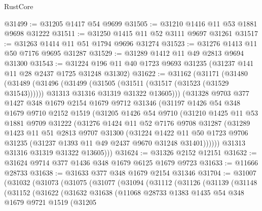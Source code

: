 \begin{lexlean}{RustCore}
\begin{coremodule}
@31499 := @31205 @1417 @54 @9699
@31505 := @31210 @1416 @11 @53 @1881 @9698 @31222
@31511 := @31250 @1415 @11 @52 @3111 @9697 @31261
@31517 := @31263 @1414 @11 @51 @1794 @9696 @31274
@31523 := @31276 @1413 @11 @50 @7176 @9695 @31287
@31529 := @31289 @1412 @11 @49 @2813 @9694 @31300
@31543 := @31224 @196 @11 @40 @1723 @9693 @31235 (@31237 @141 @11 @28 @2437 @1725 @31248 @31302)
@31622 := @31162
    (@31171
      (@31480
        (@31489
          (@31496
            (@31499 (@31505 (@31511 (@31517 (@31523 (@31529 @31543))))))
            @31313
            @31316
            @31319
            @31322
            @13605)))
      (@31328
        @9703
        @377
        @1427
        @348
        @1679
        @2154
        @1679
        @9712
        @31346
        (@31197
          @1426
          @54
          @348
          @1679
          @9710
          @2152
          @1519
          (@31205
            @1426
            @54
            @9710
            (@31210
              @1425
              @11
              @53
              @1881
              @9709
              @31222
              (@31276
                @1424
                @11
                @52
                @7176
                @9708
                @31287
                (@31289
                  @1423
                  @11
                  @51
                  @2813
                  @9707
                  @31300
                  (@31224
                    @1422
                    @11
                    @50
                    @1723
                    @9706
                    @31235
                    (@31237 @1393 @11 @49 @2437 @9670 @31248 @31401))))))
          @31313
          @31316
          @31319
          @31322
          @13605)))
@31624 := @31326 @2152 @12151
@31632 := @31624 @9714 @377 @1436 @348 @1679 @6125 @1679 @9723
@31633 := @11666 @28733
@31638 := @31633 @377 @348 @1679 @2154 @31346
@31704 := @31007
    (@31032
      (@31073
        (@31075
          (@31077
            (@31094
              (@31112
                (@31126
                  (@31139
                    (@31148
                      (@31152
                        (@31622
                          (@31632
                            @31638
                            (@11068
                              @28733
                              @1383
                              @1435
                              @54
                              @348
                              @1679
                              @9721
                              @1519
                              (@31205

\end{coremodule}
\end{lexlean}
